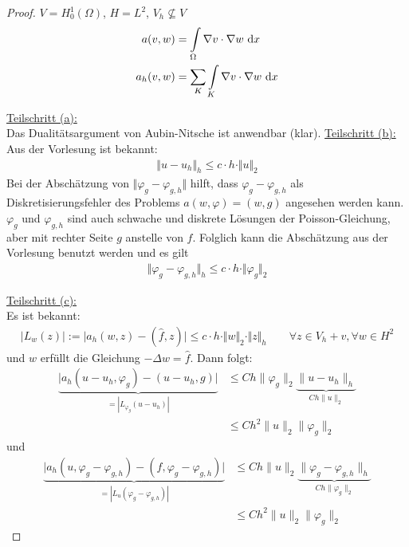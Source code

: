 \documentclass[12pt,a4paper]{article}
\begin{document}
\begin{proof}
$V=H_0^1(\Omega)$, $H=L^2$, $V_h\not\subseteq V$
\begin{align*}
a(v,w)&=\int\limits_\Omega\nabla v\cdot\nabla w\text{ d} x\\
a_h(v,w)&=\sum\limits_K\int\limits_K\nabla v\cdot\nabla w\text{ d} x
\end{align*}

\underline{Teilschritt (a):}\\
Das Dualitätsargument von Aubin-Nitsche ist anwendbar (klar).\nl
\underline{Teilschritt (b):}\\
Aus der Vorlesung ist bekannt:
\begin{align*}
\Vert u-u_h\Vert_h\leq c\cdot h\cdot\Vert u\Vert_2
\end{align*}
Bei der Abschätzung von $\Vert\varphi_g-\varphi_{g,h}\Vert$ hilft, dass $\varphi_g-\varphi_{g,h}$ als Diskretisierungsfehler des Problems $a(w,\varphi)=(w,g)$ angesehen werden kann.\nl
$\varphi_g$ und $\varphi_{g,h}$ sind auch schwache und diskrete Lösungen der Poisson-Gleichung, aber mit rechter Seite $g$ anstelle von $f$. Folglich kann die Abschätzung aus der Vorlesung benutzt werden und es gilt
\begin{align*}
\Vert\varphi_g-\varphi_{g,h}\Vert_h\leq c\cdot h\cdot\Vert\varphi_g\Vert_2
\end{align*}

\underline{Teilschritt (c):}\\
Es ist bekannt:
\begin{align*}
\big|L_w(z)\big|:=\Big|a_h(w,z)-(\hat{f},z)\Big|\leq c\cdot h\cdot\Vert w\Vert_2\cdot\Vert z\Vert_h\qquad\forall z\in V_h+v,\forall w\in H^2
\end{align*}
und $w$ erfüllt die Gleichung $-\Delta w = \hat{f}$.%
Dann folgt:
\begin{align*}
	\underbrace{\big|a_h(u-u_h,\varphi_g)-(u-u_h,g)\big|}_{=|L_{\varphi_g}(u-u_h)|} &\leq Ch \|\varphi_g\|_2\underbrace{\|u-u_h\|_h}_{Ch\|u\|_2}\\
	&\leq Ch^2 \|u\|_2\|\varphi_g\|_2
\end{align*}
und
\begin{align*}
	\underbrace{\big|a_h(u,\varphi_g-\varphi_{g,h})-(f,\varphi_g-\varphi_{g,h})\big|}_{=|L_{u}(\varphi_g-\varphi_{g,h})|} &\leq Ch \|u\|_2\underbrace{\|\varphi_g - \varphi_{g,h}\|_h}_{Ch\|\varphi_g\|_2} \\
	&\leq Ch^2 \|u\|_2\|\varphi_g\|_2
\end{align*}


\end{proof}
\end{document}

